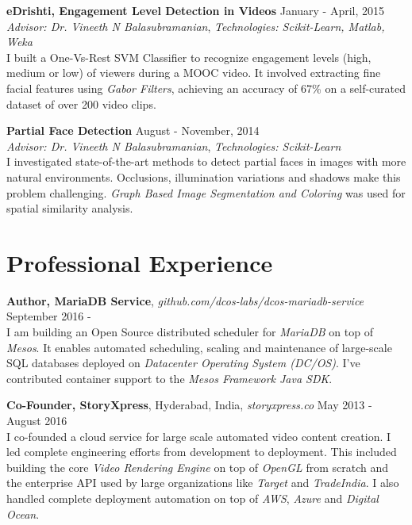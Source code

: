 \documentclass[margin,line]{res}
\begin{document}
\begin{resume}
  \vspace*{-2.5mm}

  {\bf eDrishti, Engagement Level Detection in Videos} \hfill January - April, 2015 \\
  	{\em Advisor: Dr. Vineeth N Balasubramanian}, {\em Technologies: Scikit-Learn, Matlab, Weka} \\
  	I built a One-Vs-Rest SVM Classifier to recognize engagement levels (high, medium or low) of viewers during a MOOC video. It involved extracting fine facial features using {\it Gabor Filters}, achieving an accuracy of 67\% on a self-curated dataset of over 200 video clips.

  \vspace*{-2.5mm}

  {\bf Partial Face Detection} \hfill August - November, 2014 \\
  	{\em Advisor: Dr. Vineeth N Balasubramanian}, {\em Technologies: Scikit-Learn} \\
  I investigated state-of-the-art methods to detect partial faces in images with more natural environments. Occlusions, illumination variations and shadows make this problem challenging. {\it Graph Based Image Segmentation and Coloring} was used for spatial similarity analysis.

\section{\sc Professional Experience}

  {\bf Author, MariaDB Service}, {\it github.com/dcos-labs/dcos-mariadb-service} \hfill September 2016 - \\
    I am building an Open Source distributed scheduler for {\it MariaDB} on top of {\em Mesos}. It enables automated scheduling, scaling and maintenance of large-scale SQL databases deployed on {\it Datacenter Operating System (DC/OS)}. I've contributed container support to the {\it Mesos Framework Java SDK}.

  \vspace*{-2.5mm}

  {\bf Co-Founder, StoryXpress}, Hyderabad, India, {\it storyxpress.co}  \hfill May 2013 - August 2016 \\
    I co-founded a cloud service for large scale automated video content creation. I led complete engineering efforts from development to deployment. This included building the core {\it Video Rendering Engine} on top of {\it OpenGL} from scratch and the enterprise API used by large organizations like {\it Target} and {\it TradeIndia}. I also handled complete deployment automation on top of {\it AWS}, {\it Azure} and {\it Digital Ocean}.


\end{resume}
\end{document}
